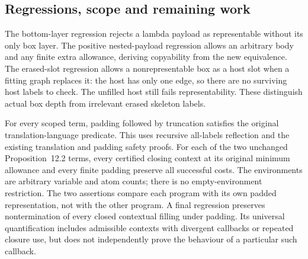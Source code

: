 

\subsection{Regressions, scope and remaining work}

The bottom-layer regression rejects a lambda payload as representable
without its only box layer. The positive nested-payload regression allows an
arbitrary body and any finite extra allowance, deriving copyability from the
new equivalence. The erased-slot regression allows a nonrepresentable box as
a host slot when a fitting graph replaces it: the host has only one edge, so
there are no surviving host labels to check. The unfilled host still fails
representability. These distinguish actual box depth from irrelevant erased
skeleton labels.




For every scoped term, padding followed by truncation satisfies the
original translation-language predicate. This uses recursive all-labels
reflection and the existing translation and padding safety proofs.
For each of the two unchanged Proposition~12.2 terms, every certified closing
context at its original minimum allowance and every finite padding preserve
all successful costs. The environments are arbitrary variable and atom counts;
there is no empty-environment restriction. The two assertions compare each
program with its own padded representation, not with the other program.
A final regression preserves nontermination of every closed contextual filling
under padding. Its universal quantification includes admissible contexts
with divergent callbacks or repeated closure use, but does not independently
prove the behaviour of a particular such callback.



